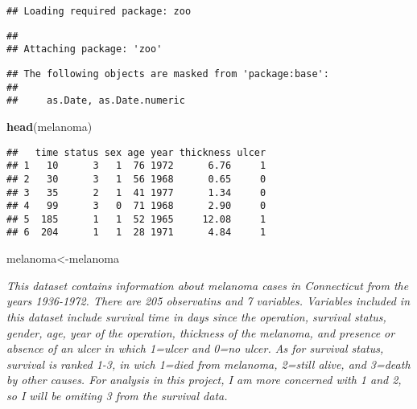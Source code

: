 \documentclass[]{article}
\newenvironment{Shaded}{\begin{snugshade}}{\end{snugshade}}
\newcommand{\DataTypeTok}[1]{\textcolor[rgb]{0.13,0.29,0.53}{#1}}
\newcommand{\DecValTok}[1]{\textcolor[rgb]{0.00,0.00,0.81}{#1}}
\newcommand{\KeywordTok}[1]{\textcolor[rgb]{0.13,0.29,0.53}{\textbf{#1}}}
\newcommand{\NormalTok}[1]{#1}
\newcommand{\OperatorTok}[1]{\textcolor[rgb]{0.81,0.36,0.00}{\textbf{#1}}}
\newcommand{\StringTok}[1]{\textcolor[rgb]{0.31,0.60,0.02}{#1}}
\begin{document}
\begin{verbatim}
## Loading required package: zoo
\end{verbatim}

\begin{verbatim}
## 
## Attaching package: 'zoo'
\end{verbatim}

\begin{verbatim}
## The following objects are masked from 'package:base':
## 
##     as.Date, as.Date.numeric
\end{verbatim}

\begin{Shaded}
\begin{Highlighting}[]
\KeywordTok{head}\NormalTok{(melanoma)}
\end{Highlighting}
\end{Shaded}

\begin{verbatim}
##   time status sex age year thickness ulcer
## 1   10      3   1  76 1972      6.76     1
## 2   30      3   1  56 1968      0.65     0
## 3   35      2   1  41 1977      1.34     0
## 4   99      3   0  71 1968      2.90     0
## 5  185      1   1  52 1965     12.08     1
## 6  204      1   1  28 1971      4.84     1
\end{verbatim}

\begin{Shaded}
\begin{Highlighting}[]
\NormalTok{melanoma<-melanoma}
\end{Highlighting}
\end{Shaded}

\emph{This dataset contains information about melanoma cases in
Connecticut from the years 1936-1972. There are 205 observatins and 7
variables. Variables included in this dataset include survival time in
days since the operation, survival status, gender, age, year of the
operation, thickness of the melanoma, and presence or absence of an
ulcer in which 1=ulcer and 0=no ulcer. As for survival status, survival
is ranked 1-3, in wich 1=died from melanoma, 2=still alive, and 3=death
by other causes. For analysis in this project, I am more concerned with
1 and 2, so I will be omiting 3 from the survival data.}

\begin{Shaded}
\end{Shaded}
\end{document}
